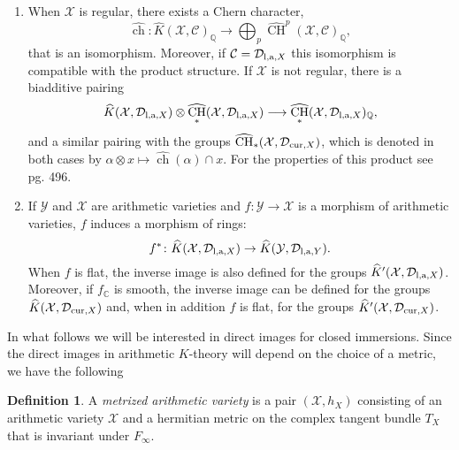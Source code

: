 \documentclass[10pt,twoside]{article}
\numberwithin{equation}{section}
\theoremstyle{plain}
\theoremstyle{definition}
\newtheorem{definition}[equation]{Definition}
\DeclareMathOperator{\cha}{\widehat{CH}}
\DeclareMathOperator{\CH}{CH}
\DeclareMathOperator{\ch}{ch}
\newcommand{\QQ}{{\mathbb Q}}
\newcommand{\las}{{\text{\rm l,a}}}
\newcommand{\D}{\text{{\rm cur}}}
\begin{document}
\begin{enumerate}
\item When $\mathcal{X}$ is regular, there exists a Chern character,
$$\widehat{\ch}\colon \widehat{K}(\mathcal{X},\mathcal{C})_{\QQ}
\longrightarrow 
\bigoplus_{p}\widehat{\CH}^{p}(\mathcal{X},\mathcal{C})_{\QQ},$$
that is an isomorphism. Moreover, if
$\mathcal{C}=\mathcal{D}_{\las,X}$ this isomorphism is compatible with
the product 
structure. If $\mathcal{X}$ is not regular, there is a biadditive
pairing
\begin{displaymath}
  \widehat K(\mathcal{X},\mathcal{D}_{\las,X})\otimes
  \cha_{\ast}(\mathcal{X},\mathcal{D}_{\las,X}) \longrightarrow
    \cha_{\ast}(\mathcal{X},\mathcal{D}_{\las,X})_{\QQ},
\end{displaymath}
and a similar pairing with the groups $
\cha_{\ast}(\mathcal{X},\mathcal{D}_{\D,X})$, which is denoted in both
cases by $\alpha \otimes x\mapsto \widehat{\ch}(\alpha )\cap x$. For
the properties of this product see \cite{GilletSoule:aRRt} pg. 496.
\item If $\mathcal{Y}$ and $\mathcal{X}$ are
arithmetic varieties and $f\colon \mathcal{Y}\to \mathcal{X}$ is a
morphism of arithmetic varieties, $f$ induces a morphism of rings:
\begin{equation*}
f^*\colon \widehat{K}(\mathcal{X},\mathcal{D}_{\las,X})\rightarrow
\widehat{K}(\mathcal{Y},\mathcal{D}_{\las,Y}).
\end{equation*}
When $f$ is flat, the inverse image is also defined for the groups
$\widehat{K}'(\mathcal{X},\mathcal{D}_{\las,X})$. Moreover, if
$f_{\mathbb{C}}$ is 
smooth, the inverse image can be defined for the groups
$\widehat{K}(\mathcal{X},\mathcal{D}_{\D,X})$ and, when in addition
$f$ is flat, for the groups 
$\widehat{K}'(\mathcal{X},\mathcal{D}_{\D,X})$. 
\end{enumerate}

In what follows we will be interested in direct images for closed
immersions. Since the direct images in arithmetic $K$-theory will
depend on the choice of a metric, we have the following

\begin{definition}
  A \textit{metrized arithmetic variety} is a pair
$(\mathcal{X},h_X)$
consisting of an arithmetic variety $\mathcal{X}$ and a hermitian
metric on the complex tangent bundle $T_{X}$ that is invariant
under $F_{\infty}$. 
\end{definition}
\end{document}
